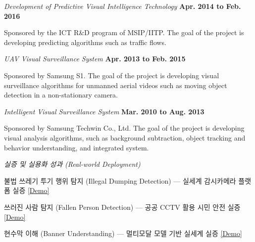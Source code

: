 \documentclass[10pt]{article}
\newenvironment{innerlist}[1][\enskip\textbullet]%
        {\begin{compactitem}[#1]}{\end{compactitem}}
\newcommand{\blankline}{\quad\pagebreak[2]}
\begin{document}
\blankline

\textit{Development of Predictive Visual Intelligence Technology}%
				\hfill \textbf{Apr. 2014 to Feb. 2016}
\begin{innerlist}
\item Sponsored by the ICT R\&D program of MSIP/IITP. The goal of the project is developing predicting algorithms such as traffic flows.

\end{innerlist}

\blankline

\textit{UAV Visual Surveillance System}%
                \hfill \textbf{Apr. 2013 to Feb. 2015}
\begin{innerlist}
\item Sponsored by Samsung S1. The goal of the project is developing visual surveillance algorithms for unmanned aerial videos such as moving object detection in a non-stationary camera.
\end{innerlist}

\blankline

\textit{Intelligent Visual Surveillance System}%
				\hfill \textbf{Mar. 2010 to Aug. 2013}


\begin{innerlist}
\item Sponsored by Samsung Techwin Co., Ltd. The goal of the project is developing visual analysis algorithms, such as background subtraction, object tracking and behavior understanding, and integrated system.
%

\end{innerlist}

\blankline

\textit{실증 및 실용화 성과 (Real-world Deployment)}%
\begin{innerlist}
\item 불법 쓰레기 투기 행위 탐지 (Illegal Dumping Detection) --- 실세계 감시카메라 플랫폼 실증 \href{https://youtu.be/v20VkzNNgKI}{[Demo]}
\item 쓰러진 사람 탐지 (Fallen Person Detection) --- 공공 CCTV 활용 시민 안전 실증 \href{https://youtu.be/LOFmzgrKMcM}{[Demo]}
\item 현수막 이해 (Banner Understanding) --- 멀티모달 모델 기반 실세계 실증 \href{https://youtu.be/3aR8GYysnzY}{[Demo]}
\end{innerlist}
\end{document}
